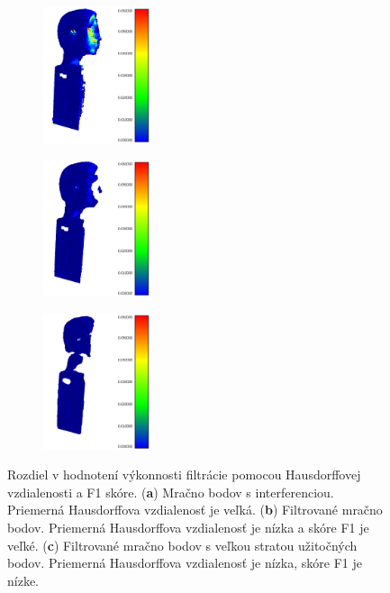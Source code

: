 \begin{figure}[h]
	\centering
	\begin{subfigure}[b]{0.32\textwidth}
		\centering
		\includegraphics[height=4cm]{figures/sorinterf.png}
		\caption{}
		\label{fig:sor_hausdorff:a}
	\end{subfigure}
	\hfill
	\begin{subfigure}[b]{0.32\textwidth}
		\centering
		\includegraphics[height=4cm]{figures/soridealfilt.png}
		\caption{}
		\label{fig:sor_hausdorff:b}
	\end{subfigure}
	\hfill
	\begin{subfigure}[b]{0.32\textwidth}
		\centering
		\includegraphics[height=4cm]{figures/soroverfilt.png}
		\caption{}
		\label{fig:sor_hausdorff:c}
	\end{subfigure}
	\caption{Rozdiel v hodnotení výkonnosti filtrácie pomocou Hausdorffovej vzdialenosti a F1 skóre. (\textbf{a}) Mračno bodov s interferenciou. Priemerná Hausdorffova vzdialenosť je veľká. (\textbf{b}) Filtrované mračno bodov. Priemerná Hausdorffova vzdialenosť je nízka a skóre F1 je veľké. (\textbf{c}) Filtrované mračno bodov s veľkou stratou užitočných bodov. Priemerná Hausdorffova vzdialenosť je nízka, skóre F1 je nízke.}
	\label{fig:sor_hausdorff}
\end{figure}

